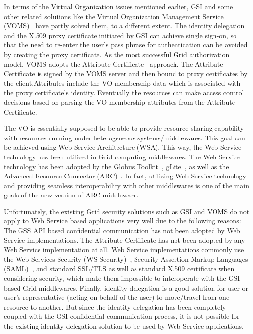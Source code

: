 \documentclass[twocolumn]{svjour3}         %
\begin{document}
In terms of the Virtual Organization issues mentioned earlier, GSI and some other related solutions like the Virtual Organization Management Service (VOMS)~\cite{AlfieriR05} have partly solved them, to a different extent. The identity delegation and the X.509 proxy certificate initiated by GSI can achieve single sign-on, so that the need to re-enter the user’s pass phrase for authentication can be avoided by creating the proxy certificate.  As the most successful Grid authorization model, VOMS adopts the Attribute Certificate~\cite{RFC3821link} approach. The Attribute Certificate is signed by the VOMS server and then bound to proxy certificates by the client.Attributes include the VO membership data which is associated with the proxy certificate’s identity. Eventually the resources can make access control decisions based on parsing the VO membership attributes from the Attribute Certificate.

The VO is essentially supposed to be able to provide resource sharing capability with resources running under heterogeneous systems/middlewares. This goal can be achieved using Web Service Architecture (WSA). This way, the Web Service technology has been utilized in Grid computing middlewares. The Web Service technology has been adopted by the Globus Toolkit~\cite{GTlink}, gLite~\cite{gLitelink}, as well as the Advanced Resource Connector (ARC)~\cite{ARClink}. In fact, utilizing Web Service technology and providing seamless interoperability with other middlewares is one of the main goals of the new version of ARC middleware.

Unfortunately, the existing Grid security solutions such as GSI and VOMS do not apply to Web Service based applications very well due to the following reasons:
The GSS API based confidential communication has not been adopted by Web Service implementations.
The Attribute Certificate has not been adopted by any Web Service implementation at all.
Web Service implementations commonly use the Web Services Security (WS-Security)~\cite{WSSeclink}, Security Assertion Markup Languages (SAML)~\cite{SAMLlink}, and standard SSL/TLS as well as standard X.509 certificate when considering security, which make them impossible to interoperate with the GSI based Grid middlewares.
Finally, identity delegation is a good solution for user or user’s representative (acting on behalf of the user) to move/travel from one resource to another. But since the identity delegation has been completely coupled with the GSI confidential communication process, it is not possible for the existing identity delegation solution to be used by Web Service applications.
\end{document}
